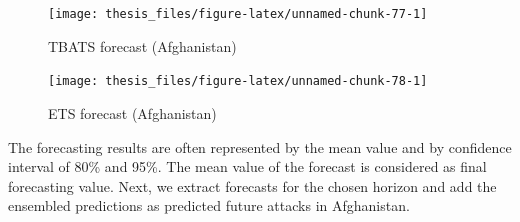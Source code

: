 \documentclass[11pt,oneside,a4paper]{reedthesis}
\newenvironment{Shaded}{\begin{snugshade}}{\end{snugshade}}
\newcommand{\KeywordTok}[1]{\textcolor[rgb]{0.13,0.29,0.53}{\textbf{#1}}}
\newcommand{\DataTypeTok}[1]{\textcolor[rgb]{0.13,0.29,0.53}{#1}}
\newcommand{\DecValTok}[1]{\textcolor[rgb]{0.00,0.00,0.81}{#1}}
\newcommand{\StringTok}[1]{\textcolor[rgb]{0.31,0.60,0.02}{#1}}
\newcommand{\OperatorTok}[1]{\textcolor[rgb]{0.81,0.36,0.00}{\textbf{#1}}}
\newcommand{\NormalTok}[1]{#1}
\begin{document}
\begin{figure}
\texttt{[image: thesis\_files/figure-latex/unnamed-chunk-77-1]} \caption{TBATS forecast (Afghanistan)}\label{fig:unnamed-chunk-77}
\end{figure}
\begin{figure}
\texttt{[image: thesis\_files/figure-latex/unnamed-chunk-78-1]} \caption{ETS forecast (Afghanistan)}\label{fig:unnamed-chunk-78}
\end{figure}
The forecasting results are often represented by the mean value and by
confidence interval of 80\% and 95\%. The mean value of the forecast is
considered as final forecasting value. Next, we extract forecasts for
the chosen horizon and add the ensembled predictions as predicted future
attacks in Afghanistan.
\begin{Shaded}
\end{Shaded}
\end{document}
